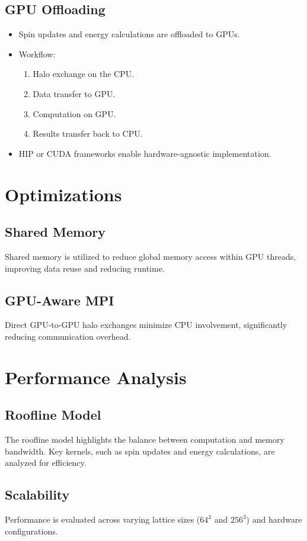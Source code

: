 \documentclass{article}
\begin{document}
\subsection{GPU Offloading}
\begin{itemize}
    \item Spin updates and energy calculations are offloaded to GPUs.
    \item Workflow:
    \begin{enumerate}
        \item Halo exchange on the CPU.
        \item Data transfer to GPU.
        \item Computation on GPU.
        \item Results transfer back to CPU.
    \end{enumerate}
    \item HIP or CUDA frameworks enable hardware-agnostic implementation.
\end{itemize}

\section{Optimizations}
\subsection{Shared Memory}
Shared memory is utilized to reduce global memory access within GPU threads, improving data reuse and reducing runtime.

\subsection{GPU-Aware MPI}
Direct GPU-to-GPU halo exchanges minimize CPU involvement, significantly reducing communication overhead.

\section{Performance Analysis}
\subsection{Roofline Model}
The roofline model highlights the balance between computation and memory bandwidth. Key kernels, such as spin updates and energy calculations, are analyzed for efficiency.

\subsection{Scalability}
Performance is evaluated across varying lattice sizes ($64^3$ and $256^3$) and hardware configurations. 
\end{document}
